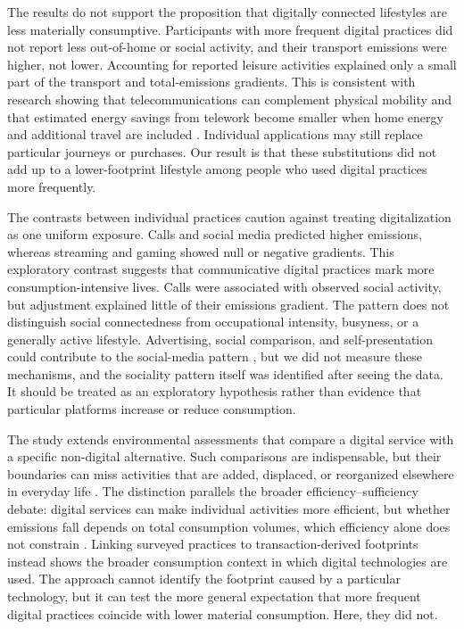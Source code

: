 \documentclass[11pt,a4paper]{article}
\begin{document}
The results do not support the proposition that digitally connected lifestyles
are less materially consumptive. Participants with more frequent digital practices did not report
less out-of-home or social activity, and their transport emissions were higher,
not lower. Accounting for reported leisure activities explained only a small
part of the transport and total-emissions gradients. This is consistent with
research showing that telecommunications can complement physical mobility and
that estimated energy savings from telework become smaller when home energy and
additional travel are included \citep{mokhtarian2002,hook2020}. Individual
applications may still replace particular journeys or purchases. Our result is
that these substitutions did not add up to a lower-footprint lifestyle among
people who used digital practices more frequently.

The contrasts between individual practices caution against treating
digitalization as one uniform exposure. Calls and social media predicted higher
emissions, whereas streaming and gaming showed null or negative gradients.
This exploratory contrast suggests that communicative digital practices mark
more consumption-intensive lives. Calls were associated with observed social
activity, but adjustment explained little of their emissions gradient. The
pattern does not distinguish social connectedness from occupational intensity,
busyness, or a generally active lifestyle.
Advertising, social comparison, and
self-presentation could contribute to the social-media pattern
\citep{vogel2014,taylor2016,djafarova2021}, but we did not measure these
mechanisms, and the sociality pattern itself was identified after seeing the
data. It should be treated as an exploratory hypothesis rather than evidence
that particular platforms increase or reduce consumption.

The study extends environmental assessments that compare a digital service with
a specific non-digital alternative. Such comparisons are indispensable, but
their boundaries can miss activities that are added, displaced, or reorganized
elsewhere in everyday life \citep{horner2016,bieser2018,pohl2019}. The
distinction parallels the broader efficiency--sufficiency debate: digital
services can make individual activities more efficient, but whether emissions
fall depends on total consumption volumes, which efficiency alone does not
constrain \citep{lange2020,wiedmann2020}. Linking
surveyed practices to transaction-derived footprints instead shows the broader
consumption context in which digital technologies are used. The approach cannot
identify the footprint caused by a particular technology, but it can test the
more general expectation that more frequent digital practices coincide with
lower material consumption. Here, they did not.
\end{document}
